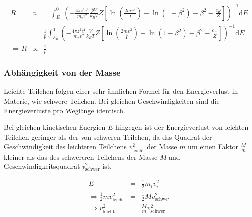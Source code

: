 \documentclass[12pt,a4paper]{scrartcl}
\numberwithin{equation}{section} %
\begin{document}
\begin{eqnarray}
    \bar{R}  &\approx&
            \quad
            \int_{E_0}^{0}
                \left(
                - \frac{4\pi z^2 e^4}{m_e v^2}
                \frac{\bar pV}{k_BT}
                Z\left[
                    \ln\left(\frac{2mv^2}{\bar I}\right)
                    - \ln\left(1 - \beta^2\right)
                    - \beta^2
                    - \frac{c_K}{Z}
                \right]
            \right)^{-1}
            \mathrm dE \nonumber\\
        &=&
            \frac{1}{\bar p}
            \int_{E_0}^{0}
                \left(
                - \frac{4\pi z^2 e^4}{m_e v^2}
                \frac{V}{k_BT}
                Z\left[
                    \ln\left(\frac{2mv^2}{\bar I}\right)
                    - \ln\left(1 - \beta^2\right)
                    - \beta^2
                    - \frac{c_K}{Z}
                \right]
            \right)^{-1}
            \mathrm dE \nonumber\\
    \Rightarrow \bar R &\propto& \frac{1}{\bar p} \label{R(p)}
\end{eqnarray}

\hypertarget{abhuxe4ngigkeit-von-der-masse}{%
\subsubsection{Abhängigkeit von der
Masse}\label{abhuxe4ngigkeit-von-der-masse}}

Leichte Teilchen folgen einer sehr ähnlichen Formel für den Energieverlust in Materie, wie schwere Teilchen. Bei gleichen Geschwindigkeiten sind die Energieverluste pro Weglänge identisch.

Bei gleichen kinetischen Energien $E$ hingegen ist der Energieverlust von leichten Teilchen geringer als der von schweren Teilchen, da das Quadrat der Geschwindigkeit des leichteren Teilchens $v_\mathrm{leicht}^2$ der Masse $m$ um einen Faktor $\frac{M}{m}$ kleiner als das des schwereren Teilchens der Masse $M$ und Geschwindigkeitsquadrat $v_\mathrm{schwer}^2$ ist.

\begin{eqnarray}
    E &=& \frac{1}{2}m_i v_i^2 \\
    \Rightarrow \frac{1}{2} m v_\mathrm{leicht}^2
        &\overset{!}{=}& \frac{1}{2} M v_\mathrm{schwer}^2 \\
    \Rightarrow v_\mathrm{leicht}^2 & = &\frac{M}{m} v_\mathrm{schwer}^2
\end{eqnarray}
\end{document}
